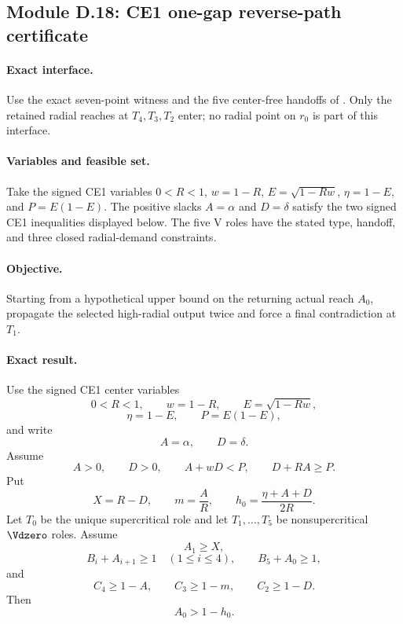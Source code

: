 \subsection{Module D.18: CE1 one-gap reverse-path certificate}
\label{subsec:app-ce1-direct-certificate}

\paragraph{Exact interface.}
Use the exact seven-point witness and the five center-free handoffs of
.  Only the retained radial reaches at
$T_4,T_3,T_2$ enter; no radial point on $r_0$ is part of this interface.

\paragraph{Variables and feasible set.}
Take the signed CE1 variables
$0<R<1$, $w=1-R$, $E=\sqrt{1-Rw}$, $\eta=1-E$, and $P=E(1-E)$.
The positive slacks $A=\alpha$ and $D=\delta$ satisfy the two signed CE1
inequalities displayed below.  The five V roles have the stated type,
handoff, and three closed radial-demand constraints.

\paragraph{Objective.}
Starting from a hypothetical upper bound on the returning actual reach
$A_0$, propagate the selected high-radial output twice and force a final
contradiction at $T_1$.

\paragraph{Exact result.}

\begin{proposition}
\label{prop:app-ce1-direct-certificate}
Use the signed CE1 center variables
\[
0<R<1,
\qquad w=1-R,
\qquad E=\sqrt{1-Rw},
\]
\[
\eta=1-E,
\qquad P=E(1-E),
\]
and write
\[
 A=\alpha,
 \qquad D=\delta.
\]
Assume
\[
 A>0,
 \qquad D>0,
 \qquad A+wD<P,
 \qquad D+RA\ge P.
 \label{eq:app-ce1-signed-domain}
\]
Put
\[
 X=R-D,
 \qquad m=\frac AR,
 \qquad h_0=\frac{\eta+A+D}{2R}.
 \label{eq:app-ce1-derived-data}
\]
Let $T_0$ be the unique supercritical role and let
$T_1,\ldots,T_5$ be nonsupercritical $\Vdzero$ roles.  Assume
\[
 A_1\ge X,
\]
\[
 B_i+A_{i+1}\ge1\quad(1\le i\le4),
 \qquad B_5+A_0\ge1,
\]
and
\[
 C_4\ge1-A,\qquad C_3\ge1-m,\qquad C_2\ge1-D.
 \label{eq:app-ce1-transverse-demands}
\]
Then
\[
 \boxed{A_0>1-h_0.}
 \label{eq:app-ce1-return}
\]
\end{proposition}

